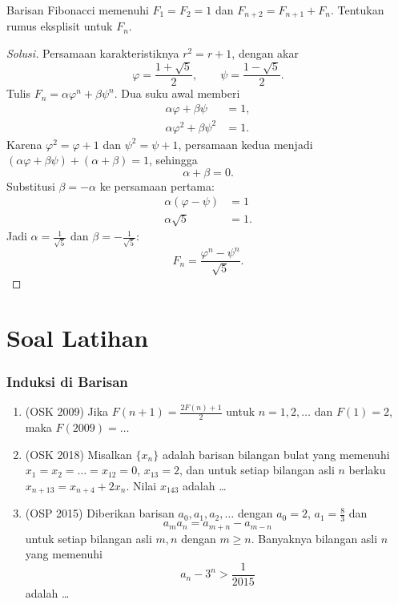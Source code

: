 \documentclass[12pt]{scrartcl}
\begin{document}
\begin{example}
Barisan Fibonacci memenuhi $F_1 = F_2 = 1$ dan $F_{n+2} = F_{n+1} + F_n$.
Tentukan rumus eksplisit untuk $F_n$.
\end{example}
\begin{proof}[Solusi]
\renewcommand{\qedsymbol}{$\blacksquare$}
Persamaan karakteristiknya $r^2 = r + 1$, dengan akar
\[ \varphi = \frac{1 + \sqrt{5}}{2}, \qquad \psi = \frac{1 - \sqrt{5}}{2}. \]
Tulis $F_n = \alpha \varphi^n + \beta \psi^n$. Dua suku awal memberi
\begin{align*}
\alpha \varphi + \beta \psi &= 1, \\
\alpha \varphi^2 + \beta \psi^2 &= 1.
\end{align*}
Karena $\varphi^2 = \varphi + 1$ dan $\psi^2 = \psi + 1$, persamaan kedua
menjadi $(\alpha\varphi + \beta\psi) + (\alpha + \beta) = 1$, sehingga
\[ \alpha + \beta = 0. \]
Substitusi $\beta = -\alpha$ ke persamaan pertama:
\begin{align*}
\alpha(\varphi - \psi) &= 1 \\
\alpha \sqrt{5} &= 1.
\end{align*}
Jadi $\alpha = \frac{1}{\sqrt{5}}$ dan $\beta = -\frac{1}{\sqrt{5}}$:
\[ F_n = \frac{\varphi^n - \psi^n}{\sqrt{5}}. \]
\end{proof}

\newpage
\part*{Soal Latihan}

\section{Induksi di Barisan}

\begin{enumerate}

	\item (OSK 2009)
	Jika $F(n+1)=\frac{2F(n)+1}{2}$ untuk $n=1,2,\dots$ dan $F(1)=2$, maka $F(2009)=\dots$

	\item (OSK 2018)
	Misalkan $\{x_{n}\}$ adalah barisan bilangan bulat yang memenuhi $x_{1}=x_{2}=\dots=x_{12}=0$, $x_{13}=2$, dan untuk setiap bilangan asli $n$ berlaku $x_{n+13}=x_{n+4}+2x_{n}$. Nilai $x_{143}$ adalah \dots

	\item (OSP 2015)
	Diberikan barisan $a_0, a_1, a_2, \dots$ dengan $a_0=2$, $a_1=\frac{8}{3}$ dan
	\[a_ma_n=a_{m+n}-a_{m-n}\]
	untuk setiap bilangan asli $m, n$ dengan $m \ge n$. Banyaknya bilangan asli $n$ yang memenuhi
	\[a_n-3^n>\frac{1}{2015}\]
	adalah \dots

\end{enumerate}
\end{document}
